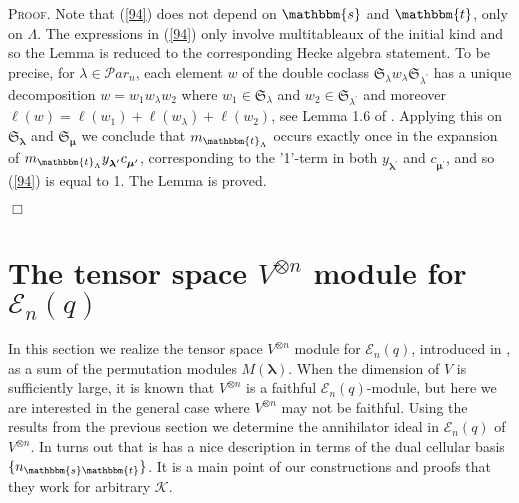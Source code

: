 \documentclass[10pt,a4,twoside,hidelinks,rm]{article}
\newcommand{\kk}{\mathcal{K}}
\newcommand{\Par}{{\mathcal Par}_n}
\newcommand\es{\mathbbm{s}}
\newcommand\et{\mathbbm{t}}
\newcommand\bu{\mathbf{u}}
\newcommand{\bT}{\pmb{\mathfrak{t}}}
\newcommand{\Si}{\mathfrak{S}}
\newcommand{\E}{ {\mathcal E}_n(q)}
\newcommand\blambda{{\boldsymbol\lambda}}
\newcommand\bmu{{\boldsymbol\mu}}
\theoremstyle{plain}
\newenvironment{demo}
{\textsc{Proof.}} {\quad \hfill $\Box$}
\begin{document}
\begin{demo}
Note that (\ref{94}) does not depend on $ \es $ and $ \et $, only on $ \Lambda$.
The expressions in (\ref{94}) only involve multitableaux of the initial
kind and so the Lemma is reduced to the corresponding Hecke algebra statement.
To be precise, for $ \lambda \in \Par $, each element $w$ of
the double coclass $ \Si_{\lambda}  w_{\lambda} \Si_{\lambda^{\prime}}  $ has a unique
decomposition $ w = w_1 w_{\lambda} w_2 $ where $ w_1 \in  \Si_{\lambda} $ and 
$ w_2 \in  \Si_{\lambda^{\prime}} $ and moreover $ \ell(w) = \ell(w_1) + \ell(w_{\lambda}) + \ell(w_2) $,
see Lemma 1.6 of \cite{DJ}. Applying this on $ \Si_{\blambda} $ and $ \Si_{\bmu} $ we conclude that
$ m_{\et_{\Lambda}} $ occurs exactly once 
in the expansion of $ m_{\et_{\Lambda}} y^{}_{ \blambda^{\prime}} c^{}_{\bmu^{\prime}} $,
corresponding to the '1'-term in both $ y^{}_{ \blambda^{\prime}} $ and $c^{}_{\bmu^{\prime}} $,
and so (\ref{94}) is equal to 1.
The Lemma is proved.



 

 
 


\end{demo}



    


\section{The tensor space $ V^{\otimes n} $ module for $ \E$}
In this section we realize the tensor space $ V^{\otimes n} $ module for $ \E$, introduced
in \cite{Ry}, as a sum of the
permutation modules $ M(\blambda)$. When the dimension of $ V $ is sufficiently large,
it is known that $ V^{\otimes n} $ is a faithful $\E$-module, but here we are interested in the general case where
$ V^{\otimes n} $ may not be faithful. Using the results from the previous section we determine the annihilator
ideal in $ \E $ of $ V^{\otimes n} $. In turns out that is has a nice description in terms of the dual cellular basis
$ \{ n_{\es\et} \} $. It is a main point of our constructions and proofs that they work for
arbitrary $ \kk$.
\end{document}

